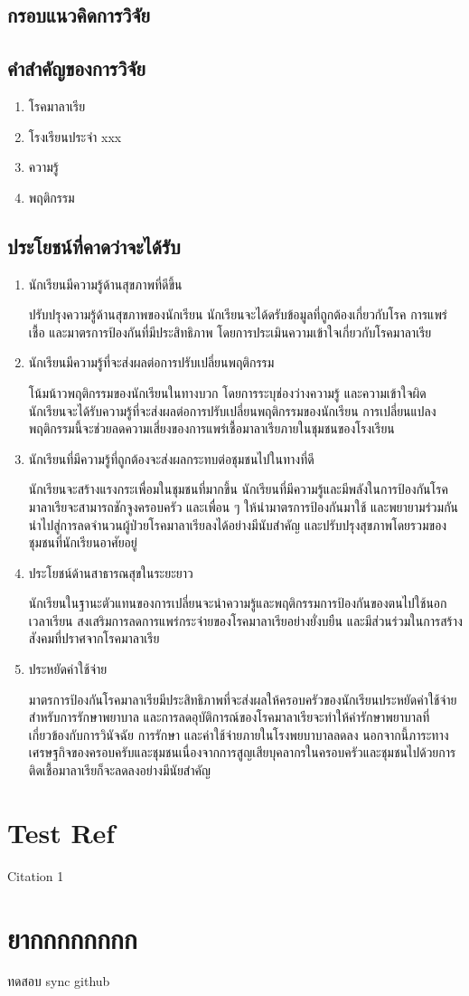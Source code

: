 \documentclass[12pt,twoside]{report}
\begin{document}
\subsection{กรอบแนวคิดการวิจัย}

\subsection{คำสำคัญของการวิจัย}
\begin{enumerate}
    \item โรคมาลาเรีย
    \item โรงเรียนประจำ xxx
    \item ความรู้
    \item พฤติกรรม
\end{enumerate}

\subsection{ประโยชน์ที่คาดว่าจะได้รับ}
\begin{enumerate}
    \item นักเรียนมีความรู้ด้านสุขภาพที่ดีขึ้น

          ปรับปรุงความรู้ด้านสุขภาพของนักเรียน นักเรียนจะได้ดรับข้อมูลที่ถูกต้องเกี่ยวกับโรค การแพร่เชื้อ และมาตรการป้องกันที่มีประสิทธิภาพ โดยการประเมินความเข้าใจเกี่ยวกับโรคมาลาเรีย
    \item นักเรียนมีความรู้ที่จะส่งผลต่อการปรับเปลี่ยนพฤติกรรม

          โน้มน้าวพฤติกรรมของนักเรียนในทางบวก โดยการระบุช่องว่างความรู้ และความเข้าใจผิด นักเรียนจะได้รับความรู้ที่จะส่งผลต่อการปรับเปลี่ยนพฤติกรรมของนักเรียน การเปลี่ยนแปลงพฤติกรรมนี้จะช่วยลดความเสี่ยงของการแพร่เชื้อมาลาเรียภายในชุมชนของโรงเรียน
    \item นักเรียนที่มีความรู้ที่ถูกต้องจะส่งผลกระทบต่อชุมชนไปในทางที่ดี

          นักเรียนจะสร้างแรงกระเพื่อมในชุมชนที่มากขึ้น นักเรียนที่มีความรู้และมีพลังในการป้องกันโรคมาลาเรียจะสามารถชักจูงครอบครัว และเพื่อน ๆ ให้นำมาตรการป้องกันมาใช้ และพยายามร่วมกันนำไปสู่การลดจำนวนผู้ป่วยโรคมาลาเรียลงได้อย่างมีนับสำคัญ และปรับปรุงสุขภาพโดยรวมของชุมชนที่นักเรียนอาศัยอยู่
    \item ประโยชน์ด้านสาธารณสุขในระยะยาว

          นักเรียนในฐานะตัวแทนของการเปลี่ยนจะนำความรู้และพฤติกรรมการป้องกันของตนไปใช้นอกเวลาเรียน สงเสริมการลดการแพร่กระจ่ายของโรคมาลาเรียอย่างยั่งบยืน และมีส่วนร่วมในการสร้างสังคมที่ปราศจากโรคมาลาเรีย
    \item 	ประหยัดค่าใช้จ่าย

          มาตรการป้องกันโรคมาลาเรียมีประสิทธิภาพที่จะส่งผลให้ครอบครัวของนักเรียนประหยัดค่าใช้จ่ายสำหรับการรักษาพยาบาล และการลดอุบัติการณ์ของโรคมาลาเรียจะทำให้ค่ารักษาพยาบาลที่เกี่ยวข้องกับการวินัจฉัย การรักษา และค่าใช้จ่ายภายในโรงพยบาบาลลดลง นอกจากนี้ภาระทางเศรษฐกิจของครอบครับและชุมชนเนื่องจากการสูญเสียบุคลากรในครอบครัวและชุมชนไปด้วยการติดเชื้อมาลาเรียก็จะลดลงอย่างมีนัยสำคัญ
\end{enumerate}
\newpage

\section{Test Ref}
Citation 1 \cite{test01}

\section{ยากกกกกกกก}
ทดสอบ sync github



\end{document}
